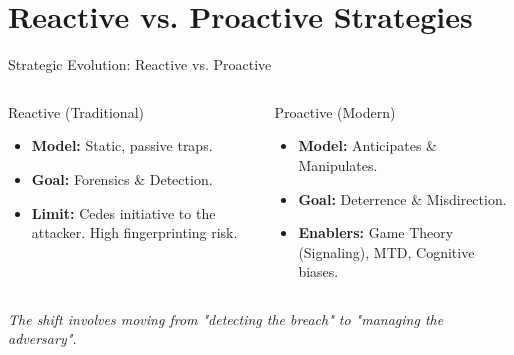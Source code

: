 \documentclass[12pt, aspectratio=169]{beamer}
\begin{document}
\section{Reactive vs. Proactive Strategies}
\begin{frame}{Strategic Evolution: Reactive vs. Proactive}
    \begin{columns}
        \begin{alertblock}{Reactive (Traditional)}
            \begin{itemize}
                \item \textbf{Model:} Static, passive traps.
                \item \textbf{Goal:} Forensics \& Detection.
                \item \textbf{Limit:} Cedes initiative to the attacker. High fingerprinting risk.
            \end{itemize}
        \end{alertblock}

        \begin{exampleblock}{Proactive (Modern)}
            \begin{itemize}
                \item \textbf{Model:} Anticipates \& Manipulates.
                \item \textbf{Goal:} Deterrence \& Misdirection.
                \item \textbf{Enablers:} Game Theory (Signaling), MTD, Cognitive biases.
            \end{itemize}
        \end{exampleblock}
    \end{columns}
    \vspace{0.5cm}
    \centering
    \textit{The shift involves moving from "detecting the breach" to "managing the adversary".}
\end{frame}
\end{document}
